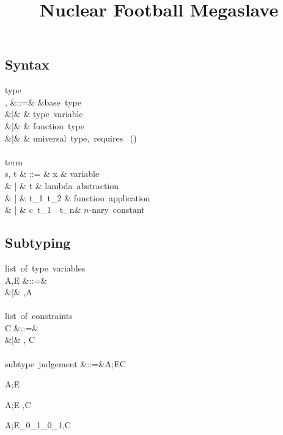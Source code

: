 \documentclass{amsart}
\title{Nuclear Football Megaslave}
\theoremstyle{definition}
\begin{document}
\maketitle
\tableofcontents

\subsection{Syntax}
\label{syntax}
\begin{syntax}
\mbox{type}\\
\sigma, \tau
&::=& \iota &\mbox{base type}\\
&|& \alpha & \mbox{type variable} \\
&|& \tau \rightarrow \tau & \mbox{function type} \\
&|& \All\alpha\tau
&
\mbox{universal type, requires }
\alpha\in\FTV(\tau)\tau\neq\alpha
\\
\\
\mbox{term}\\
s, t & ::= & x & \mbox{variable} \\
& | & t  & \mbox{lambda abstraction} \\
& | & t_1~t_2 & \mbox{function application} \\
& | & c~t_1~\cdots~t_n& \mbox{$n$-nary constant}
\end{syntax}

\subsection{Subtyping}

\begin{syntax}
\mbox{list of type variables}\\
A,E
&::=& \emptyset \\
&|& \alpha,A
\\
\\
\mbox{list of constraints}\\
C
&::=& \emptyset \\
&|& \sigma \Sub \tau, C
\\
\\
\mbox{subtype judgement}
&::=&A;E\vdash C
\end{syntax}

\infrule[S-vacuous]
{}
{A;E\vdash\emptyset}

{A;E \vdash \tau\Sub\tau,C}

{A;E\vdash\sigma_0\R\sigma_1\Sub\tau_0\R\tau_1,C}
\end{document}
